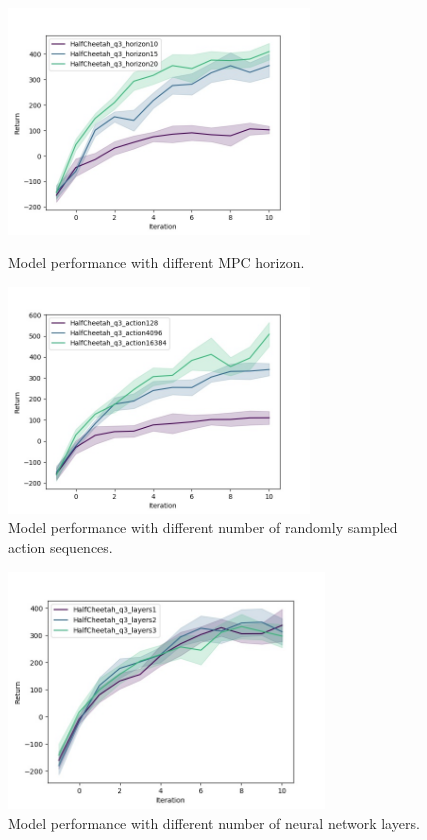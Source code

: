 \documentclass[12pt]{article}
\begin{document}
\begin{figure}[!h]
\centering
\begin{minipage}[t]{0.48\textwidth}
\centering
\includegraphics[width=8cm]{Figure_3.jpg}
\caption{Model performance with different MPC horizon.}
\end{minipage}
\begin{minipage}[t]{0.48\textwidth}
\centering
\includegraphics[width=8cm]{Figure_4.jpg}
\caption{Model performance with different number of randomly sampled action sequences.}
\end{minipage}
\end{figure}

\begin{figure}[!h]
\centering
\includegraphics[width=3.3in]{Figure_5.jpg}
\caption{Model performance with different number of neural network
layers.}
\end{figure}
\end{document}
